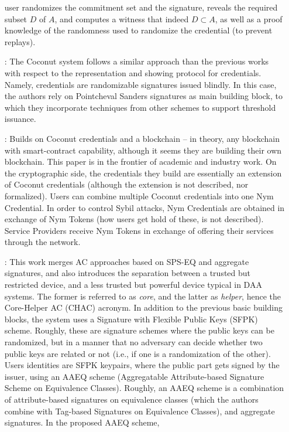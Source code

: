 \begin{enumerate}
  user randomizes the commitment set and the signature, reveals the required
  subset $D$ of $A$, and computes a witness that indeed $D \subset A$, as well
  as a proof knowledge of the randomness used to randomize the credential (to
  prevent replays). 
\item[\cite{sms+19}:] The Coconut system follows a similar approach than the previous
  works with respect to the representation and showing protocol for credentials.
  Namely, credentials are randomizable signatures issued blindly. In this case,
  the authors rely on Pointcheval Sanders signatures \cite{ps16} as main
  building block, to which they incorporate techniques from other schemes to
  support threshold issuance.
\item[\cite{halp20}:] Builds on Coconut credentials and a blockchain -- in theory,
  any blockchain with smart-contract capability, although it seems they are building
  their own blockchain. This paper is in the frontier of academic and industry
  work. On the cryptographic side, the credentials they build are essentially an
  extension of Coconut credentials (although the extension is not described, nor
  formalized). Users can combine multiple Coconut credentials into one Nym
  Credential. In order to control Sybil attacks, Nym Credentials are obtained
  in exchange of Nym Tokens (how users get hold of these, is not described).
  Service Providers receive Nym Tokens in exchange of offering their services
  through the network.
\item[\cite{hs21}:] This work merges AC approaches based on SPS-EQ and aggregate
  signatures, and also introduces the separation between a trusted but restricted
  device, and a less trusted but powerful device typical in DAA systems. The
  former is referred to as \emph{core}, and the latter as \emph{helper}, hence
  the Core-Helper AC (CHAC) acronym. In addition to the previous basic building
  blocks, the system uses a Signature with Flexible Public Keys (SFPK) scheme.
  Roughly, these are signature schemes where the public keys can be randomized,
  but in a manner that no adversary can decide whether two public keys are
  related or not (i.e., if one is a randomization of the other). Users identities
  are SFPK keypairs, where the public part gets signed by the issuer, using an
  AAEQ scheme (Aggregatable Attribute-based Signature Scheme on Equivalence Classes).
  Roughly, an AAEQ scheme is a combination of attribute-based signatures on
  equivalence classes (which the authors combine with Tag-based Signatures on
  Equivalence Classes), and aggregate signatures. In the proposed AAEQ scheme,

\end{enumerate}
